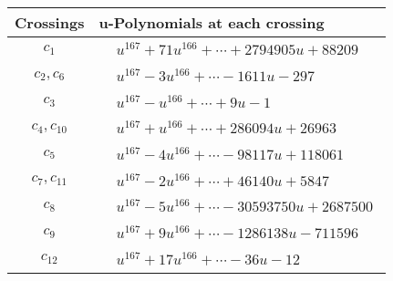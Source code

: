 \documentclass[1p]{elsarticle_modified}
\theoremstyle{definition}
\begin{document}
\begin{tabular}{m{50pt}|m{274pt}}
Crossings & \hspace{64pt}u-Polynomials at each crossing \\
\hline $$\begin{aligned}c_{1}\end{aligned}$$&$\begin{aligned}
&u^{167}+71 u^{166}+\cdots+2794905 u+88209
\end{aligned}$\\
\hline $$\begin{aligned}c_{2},c_{6}\end{aligned}$$&$\begin{aligned}
&u^{167}-3 u^{166}+\cdots-1611 u-297
\end{aligned}$\\
\hline $$\begin{aligned}c_{3}\end{aligned}$$&$\begin{aligned}
&u^{167}- u^{166}+\cdots+9 u-1
\end{aligned}$\\
\hline $$\begin{aligned}c_{4},c_{10}\end{aligned}$$&$\begin{aligned}
&u^{167}+u^{166}+\cdots+286094 u+26963
\end{aligned}$\\
\hline $$\begin{aligned}c_{5}\end{aligned}$$&$\begin{aligned}
&u^{167}-4 u^{166}+\cdots-98117 u+118061
\end{aligned}$\\
\hline $$\begin{aligned}c_{7},c_{11}\end{aligned}$$&$\begin{aligned}
&u^{167}-2 u^{166}+\cdots+46140 u+5847
\end{aligned}$\\
\hline $$\begin{aligned}c_{8}\end{aligned}$$&$\begin{aligned}
&u^{167}-5 u^{166}+\cdots-30593750 u+2687500
\end{aligned}$\\
\hline $$\begin{aligned}c_{9}\end{aligned}$$&$\begin{aligned}
&u^{167}+9 u^{166}+\cdots-1286138 u-711596
\end{aligned}$\\
\hline $$\begin{aligned}c_{12}\end{aligned}$$&$\begin{aligned}
&u^{167}+17 u^{166}+\cdots-36 u-12
\end{aligned}$\\
\hline
\end{tabular}\\~\\
\end{document}
